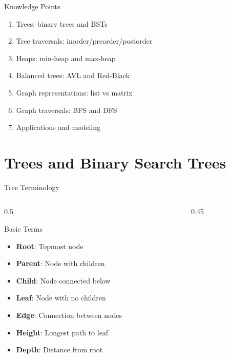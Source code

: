 \documentclass[aspectratio=169,xcolor=dvipsnames]{beamer}
\begin{document}
\begin{frame}{Knowledge Points}
  \begin{enumerate}
    \item Trees: binary trees and BSTs
    \item Tree traversals: inorder/preorder/postorder
    \item Heaps: min-heap and max-heap
    \item Balanced trees: AVL and Red-Black
    \item Graph representations: list vs matrix
    \item Graph traversals: BFS and DFS
    \item Applications and modeling
  \end{enumerate}
\end{frame}

\section{Trees and Binary Search Trees}

\begin{frame}{Tree Terminology}
  \begin{columns}
    \begin{column}{0.5\textwidth}
      \begin{block}{Basic Terms}
        \begin{itemize}
          \item \textbf{Root}: Topmost node
          \item \textbf{Parent}: Node with children
          \item \textbf{Child}: Node connected below
          \item \textbf{Leaf}: Node with no children
          \item \textbf{Edge}: Connection between nodes
          \item \textbf{Height}: Longest path to leaf
          \item \textbf{Depth}: Distance from root
        \end{itemize}
      \end{block}
    \end{column}
    \begin{column}{0.45\textwidth}
    \end{column}
  \end{columns}
\end{frame}
\end{document}
